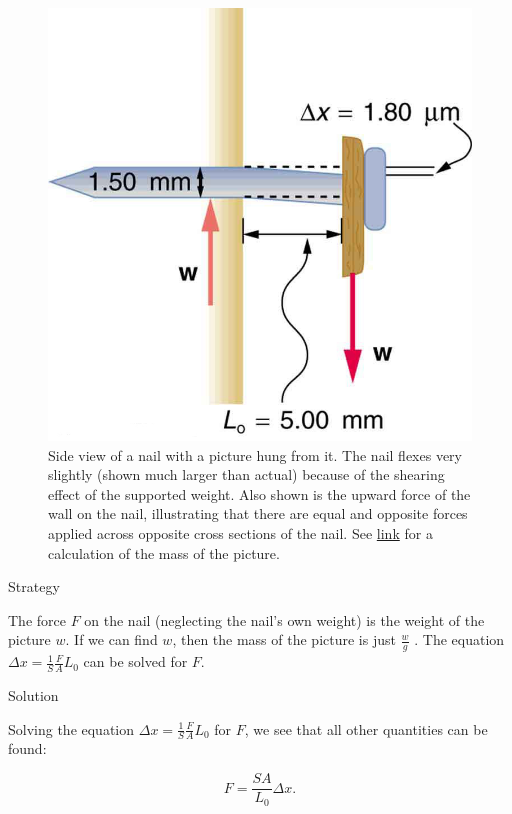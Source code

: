 \documentclass[
]{book}
\begin{document}
\begin{figure}
\hypertarget{import-auto-id1165298644588}{%
\centering
\includegraphics{images/Figure_06_03_08a.jpg}
\caption{Side view of a nail with a picture hung from it. The nail flexes very
slightly (shown much larger than actual) because of the shearing effect
of the supported weight. Also shown is the upward force of the wall on
the nail, illustrating that there are equal and opposite forces applied
across opposite cross sections of the nail. See
\protect\hyperlink{fs-id1165296288315}{link} for a calculation of
the mass of the
picture.}\label{import-auto-id1165298644588}
}
\end{figure}

{Strategy}

The force \(F{}\) on the nail (neglecting the nail's own weight) is the
weight of the picture \(w{}\). If we can find \(w{}\), then the mass of the
picture is just \(\frac{w}{g}{}\) . The equation
\({{\Delta x = \frac{1}{S}}\frac{F}{A}L_{0}}{}\) can be solved for \(F{}\).

{Solution}

Solving the equation \({{\Delta x = \frac{1}{S}}\frac{F}{A}L_{0}}{}\) for
\(F\), we see that all other quantities can be found:

\leavevmode{}%
\[{{{F = \frac{SA}{L_{0}}}\Delta x}.}{}\]
\end{document}
